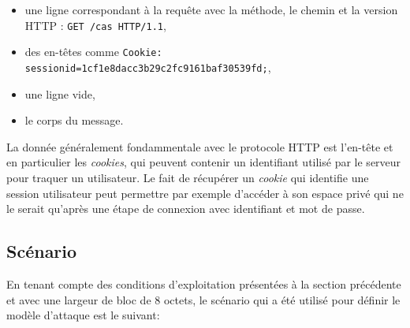\documentclass[a4paper,twoside]{article}
\begin{document}
\begin{itemize}
    \item une ligne correspondant à la requête avec la méthode, le chemin et
	la version HTTP : \texttt{GET /cas HTTP/1.1},
    \item des en-têtes comme \texttt{Cookie: sessionid=1cf1e8dacc3b29c2fc9161baf30539fd;},
    \item une ligne vide,
    \item le corps du message.
\end{itemize}

La donnée généralement fondammentale avec le protocole HTTP est l'en-tête et
en particulier les \emph{cookies}, qui peuvent contenir un identifiant
utilisé par le serveur pour traquer un utilisateur. Le fait de récupérer un
\emph{cookie} qui identifie une session utilisateur peut permettre par
exemple d'accéder à son espace privé qui ne le serait qu'après une étape de
connexion avec identifiant et mot de passe.

\subsection{Scénario}

En tenant compte des conditions d'exploitation présentées à la section
précédente et avec une largeur de bloc de 8 octets, le scénario qui a été
utilisé pour définir le modèle d'attaque est le suivant:
\end{document}

